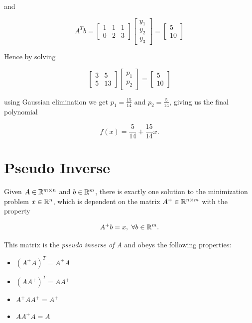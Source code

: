and 

\[
        A^T b
        =
        \begin{bmatrix}
            1 & 1 & 1 \\ 
            0 & 2 & 3        
        \end{bmatrix}
        \begin{bmatrix}
            y_1 \\ 
            y_2 \\ 
            y_3
        \end{bmatrix}
        = 
        \begin{bmatrix}
            5 \\ 
            10
        \end{bmatrix}
\]

Hence by solving 

\[
        \begin{bmatrix}
            3 & 5 \\ 
            5 & 13
        \end{bmatrix}
         \begin{bmatrix}
            p_1 \\ 
            p_2
        \end{bmatrix}
        = 
        \begin{bmatrix}
            5 \\ 
            10
        \end{bmatrix}
\]

using Gaussian elimination we get \(p_1 = \frac{15}{14}\) and \(p_2 = \frac{5}{14}\), giving us the final polynomial 

\[
        f(x) = \frac{5}{14} + \frac{15}{14}x.
\]


\section{Pseudo Inverse}

Given \(A \in \mathbb{R}^{m \times n}\) and \(b \in \mathbb{R}^m\), there is exactly one solution to the minimization problem \(x \in \mathbb{R}^n\), which is dependent on the 
matrix \(A^+ \in \mathbb{R}^{n \times m}\) with the property 

\[
        A^+ b = x, \ \forall b \in \mathbb{R}^m.
\]

This matrix is the \emph{pseudo inverse of A} and obeys the following properties: 

\begin{itemize}

    \item \((A^+ A)^T = A^+ A\)
   
    \item \((AA^+)^T = AA^+ \)

    \item \(A^+ A A^+ = A^+\)
    
    \item \(A A^+ A = A\)

\end{itemize}

